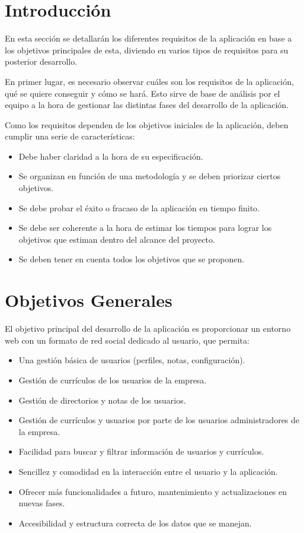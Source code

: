 \section{Introducción}
En esta sección se detallarán los diferentes requisitos de la aplicación en base a los objetivos principales de esta, diviendo en varios tipos de requisitos para su posterior desarrollo.

En primer lugar, es necesario observar cuáles son los requisitos de la aplicación, qué
se quiere conseguir y cómo se hará. Esto sirve de base de análisis por el equipo a la
hora de gestionar las distintas fases del desarrollo de la aplicación.

Como los requisitos dependen de los objetivos iniciales de la aplicación, deben cumplir una serie
de características:
\begin{itemize}
 \item Debe haber claridad a la hora de su especificación.
 \item Se organizan en función de una metodología y se deben priorizar ciertos objetivos.
 \item Se debe probar el éxito o fracaso de la aplicación en tiempo finito.
 \item Se debe ser coherente a la hora de estimar los tiempos para lograr los
 objetivos que estiman dentro del alcance del proyecto.
 \item Se deben tener en cuenta todos los objetivos que se proponen.
\end{itemize}

\section{Objetivos Generales}
El objetivo principal del desarrollo de la aplicación es proporcionar un entorno web con un formato de red social dedicado al usuario, que permita:
\begin{itemize}
 \item Una gestión básica de usuarios (perfiles, notas, configuración).
 \item Gestión de currículos de los usuarios de la empresa.
 \item Gestión de directorios y notas de los usuarios.
 \item Gestión de currículos y usuarios por parte de los usuarios administradores de la empresa.
 \item Facilidad para buscar y filtrar información de usuarios y currículos.
 \item Sencillez y comodidad en la interacción entre el usuario y la aplicación.
 \item Ofrecer más funcionalidades a futuro, mantenimiento y actualizaciones en nuevas fases.
 \item Accesibilidad y estructura correcta de los datos que se manejan.
\end{itemize}

